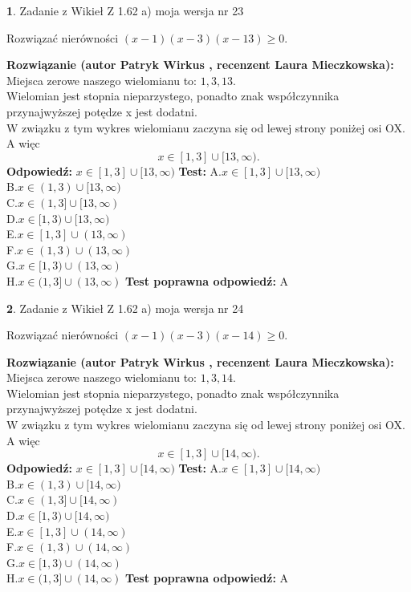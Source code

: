 \documentclass[12pt, a4paper]{article}
\theoremstyle{definition} %
\newtheorem{zad}{}
\newcommand{\zadStart}[1]{\begin{zad}#1\newline}
\newcommand{\zadStop}{\end{zad}}
\newcommand{\rozwStart}[2]{\noindent \textbf{Rozwiązanie (autor #1 , recenzent #2): }\newline}
\newcommand{\rozwStop}{\newline}
\newcommand{\odpStart}{\noindent \textbf{Odpowiedź:}\newline}
\newcommand{\odpStop}{\newline}
\newcommand{\testStart}{\noindent \textbf{Test:}\newline}
\newcommand{\testStop}{\newline}
\newcommand{\kluczStart}{\noindent \textbf{Test poprawna odpowiedź:}\newline}
\newcommand{\kluczStop}{\newline}
\begin{document}
\zadStart{Zadanie z Wikieł Z 1.62 a) moja wersja nr 23}

Rozwiązać nierówności $(x-1)(x-3)(x-13)\ge0$.
\zadStop
\rozwStart{Patryk Wirkus}{Laura Mieczkowska}
Miejsca zerowe naszego wielomianu to: $1, 3, 13$.\\
Wielomian jest stopnia nieparzystego, ponadto znak współczynnika przy\linebreak najwyższej potędze x jest dodatni.\\ W związku z tym wykres wielomianu zaczyna się od lewej strony poniżej osi OX. A więc $$x \in [1,3] \cup [13,\infty).$$
\rozwStop
\odpStart
$x \in [1,3] \cup [13,\infty)$
\odpStop
\testStart
A.$x \in [1,3] \cup [13,\infty)$\\
B.$x \in (1,3) \cup [13,\infty)$\\
C.$x \in (1,3] \cup [13,\infty)$\\
D.$x \in [1,3) \cup [13,\infty)$\\
E.$x \in [1,3] \cup (13,\infty)$\\
F.$x \in (1,3) \cup (13,\infty)$\\
G.$x \in [1,3) \cup (13,\infty)$\\
H.$x \in (1,3] \cup (13,\infty)$
\testStop
\kluczStart
A
\kluczStop



\zadStart{Zadanie z Wikieł Z 1.62 a) moja wersja nr 24}

Rozwiązać nierówności $(x-1)(x-3)(x-14)\ge0$.
\zadStop
\rozwStart{Patryk Wirkus}{Laura Mieczkowska}
Miejsca zerowe naszego wielomianu to: $1, 3, 14$.\\
Wielomian jest stopnia nieparzystego, ponadto znak współczynnika przy\linebreak najwyższej potędze x jest dodatni.\\ W związku z tym wykres wielomianu zaczyna się od lewej strony poniżej osi OX. A więc $$x \in [1,3] \cup [14,\infty).$$
\rozwStop
\odpStart
$x \in [1,3] \cup [14,\infty)$
\odpStop
\testStart
A.$x \in [1,3] \cup [14,\infty)$\\
B.$x \in (1,3) \cup [14,\infty)$\\
C.$x \in (1,3] \cup [14,\infty)$\\
D.$x \in [1,3) \cup [14,\infty)$\\
E.$x \in [1,3] \cup (14,\infty)$\\
F.$x \in (1,3) \cup (14,\infty)$\\
G.$x \in [1,3) \cup (14,\infty)$\\
H.$x \in (1,3] \cup (14,\infty)$
\testStop
\kluczStart
A
\kluczStop
\end{document}
